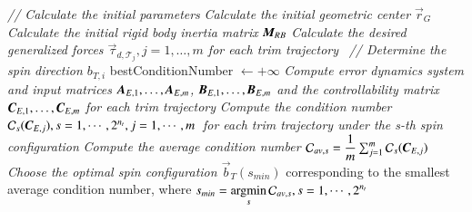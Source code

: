 \IncMargin{1em}
\begin{algorithm}
\SetAlgoLined
{}
\BlankLine
\emph{// Calculate the initial parameters}\;
\emph{Calculate the initial geometric center $\vec{r}_{G}$}\;
\emph{Calculate the initial rigid body inertia matrix $\emph{\textbf{M}}_{RB}$}\;
\emph{Calculate the desired generalized forces $\vec{\tau}_{d,\mathcal{T}_{j}}, j=1, \ldots, m$ for each trim trajectory}\
\BlankLine
\emph{// Determine the spin direction $b_{T,i}$}\;
bestConditionNumber $\longleftarrow +\infty$\;
{
\emph{Compute error dynamics system and input matrices $\emph{\textbf{A}}_{E,1}, \ldots, \emph{\textbf{A}}_{E,m}$, $\emph{\textbf{B}}_{E,1}, \ldots, \emph{\textbf{B}}_{E,m}$ and the controllability matrix $\emph{\textbf{C}}_{E,1}, \ldots, \emph{\textbf{C}}_{E,m}$ for each trim trajectory}\;
\emph{Compute the condition number $\mathcal{C}_{s}(\emph{\textbf{C}}_{E,j}), s=1, \cdots, 2^{n_{t}}, j=1, \cdots, m$~for each trim trajectory under the s-th spin configuration}\;
\emph{Compute the average condition number $\mathcal{C}_{av,s}=\dfrac{1}{m}\sum_{j=1}^{m}\mathcal{C}_{s}(\emph{\textbf{C}}_{E,j})$}\;
}
\emph{Choose the optimal spin configuration $\vec{b}_{T}(s_{min})$} corresponding to the smallest average condition number, where $s_{min}=\displaystyle \operatorname*{\arg\!\min}_{s}\mathcal{C}_{av,s}, s=1, \cdots, 2^{n_{t}}$\;

\end{algorithm}
